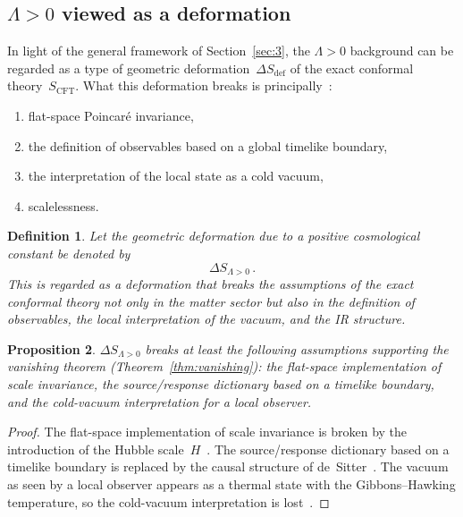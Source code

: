 \documentclass[
  aps,
  prd,
  preprint,
  groupedaddress,
  nofootinbib,
  longbibliography
]{revtex4-2}
\newtheorem{definition}{Definition}[section]
\newtheorem{proposition}[definition]{Proposition}
\theoremstyle{remark}
\begin{document}
\subsection{\texorpdfstring{$\Lambda>0$}{Lambda>0} viewed as a
  deformation}\label{subsec:4-6}

In light of the general framework of Section~\ref{sec:3}, the
$\Lambda>0$ background can be regarded as a type of geometric
deformation~$\Delta S_{\mathrm{def}}$ of the exact conformal
theory~$S_{\mathrm{CFT}}$.
What this deformation breaks is
principally~\cite{ref15,ref16,ref17,ref18,ref19,ref20,ref21}:
\begin{enumerate}
\item flat-space Poincar\'e invariance,
\item the definition of observables based on a global timelike
  boundary,
\item the interpretation of the local state as a cold vacuum,
\item scalelessness.
\end{enumerate}

\begin{definition}\label{def:Lambda-deformation}
Let the geometric deformation due to a positive cosmological
constant be denoted by
\begin{equation}\label{eq:DeltaS-Lambda}
  \Delta S_{\Lambda>0}\,.
\end{equation}
This is regarded as a deformation that breaks the assumptions of
the exact conformal theory not only in the matter sector but also
in the definition of observables, the local interpretation of the
vacuum, and the IR structure.
\end{definition}

\begin{proposition}\label{prop:Lambda-breaks}
$\Delta S_{\Lambda>0}$ breaks at least the following assumptions
supporting the vanishing theorem
(Theorem~\ref{thm:vanishing}): the flat-space implementation of scale
invariance, the source/response dictionary based on a timelike
boundary, and the cold-vacuum interpretation for a local observer.
\end{proposition}

\begin{proof}
The flat-space implementation of scale invariance is broken by
the introduction of the Hubble
scale~$H$~\cite{ref17,ref20,ref21}.
The source/response dictionary based on a timelike boundary is
replaced by the causal structure of
de~Sitter~\cite{ref16,ref17,ref18,ref19,ref20,ref21}.
The vacuum as seen by a local observer appears as a thermal state
with the Gibbons--Hawking temperature, so the cold-vacuum
interpretation is
lost~\cite{ref15,ref17,ref20,ref21,ref23}.
\end{proof}
\end{document}
